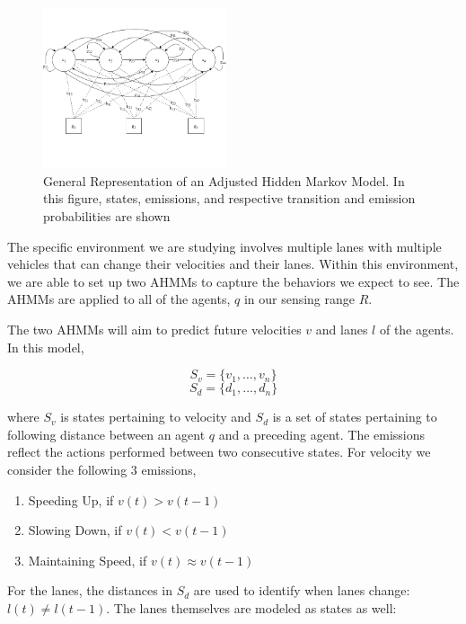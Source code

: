 \documentclass[letterpaper, 10 pt, conference]{ieeeconf}  %
\newcommand\NB[1]{$\spadesuit$\footnote{NB: #1}}
\begin{document}
\begin{figure}[ht!]
    \includegraphics[width=0.48\textwidth]{ahmm.png}
    \caption{General Representation of an Adjusted Hidden Markov Model. In this figure, states, emissions, and respective transition and emission probabilities are shown}
    \label{fig:hmm}
\end{figure}

The specific environment we are studying involves multiple lanes with multiple vehicles that can change their velocities and their lanes. Within this environment, we are able to set up two AHMMs to capture the behaviors we expect to see. The AHMMs are applied to all of the agents, $q$ in our sensing range $R$.

The two AHMMs will aim to predict future velocities $v$ and lanes $l$ of the agents. In this model,

\begin{equation}
    S_v = \{v_1,\ldots, v_n\}
\end{equation}
\begin{equation}
    S_d = \{d_1,\ldots,d_n\}
\end{equation}

    where $S_v$ is states pertaining to velocity and $S_d$ is a set of states pertaining to following distance between an agent $q$ and a preceding agent. The emissions reflect the actions performed between two consecutive states. For velocity we consider the following 3 emissions,

\begin{enumerate}
    \item Speeding Up, if $v(t) > v(t-1)$
    \item Slowing Down, if $v(t) < v(t-1)$
    \item Maintaining Speed, if $v(t) \approx v(t-1)$
\end{enumerate}

For the lanes,  the distances in $S_d$ are used to identify when lanes change: $l(t) \neq l(t-1)$. The lanes themselves are modeled as states as well:
\end{document}
